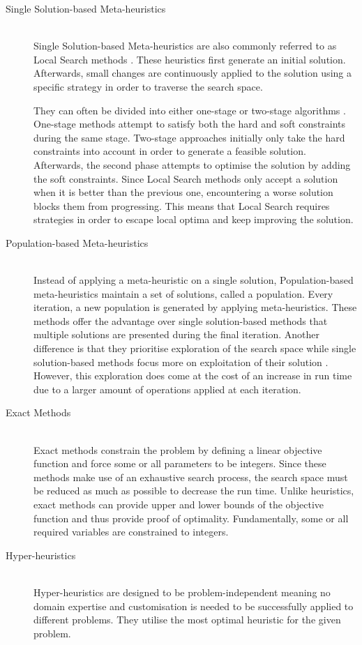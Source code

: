 \begin{description}
\item [Single Solution-based Meta-heuristics] \hfill \\
Single Solution-based Meta-heuristics are also commonly referred to as Local Search methods \cite{lin1973}. These heuristics first generate an initial solution. Afterwards, small changes are continuously applied to the solution using a specific strategy in order to traverse the search space. 

They can often be divided into either one-stage or two-stage algorithms \cite{lewis2008}. One-stage methods attempt to satisfy both the hard and soft constraints during the same stage. Two-stage approaches initially only take the hard constraints into account in order to generate a feasible solution. Afterwards, the second phase attempts to optimise the solution by adding the soft constraints. Since Local Search methods only accept a solution when it is better than the previous one, encountering a worse solution blocks them from progressing. This means that Local Search requires strategies in order to escape local optima and keep improving the solution. 



\item [Population-based Meta-heuristics] \hfill \\
Instead of applying a meta-heuristic on a single solution, Population-based meta-heuristics maintain a set of solutions, called a population. Every iteration, a new population is generated by applying meta-heuristics. These methods offer the advantage over single solution-based methods that multiple solutions are presented during the final iteration. Another difference is that they prioritise exploration of the search space while single solution-based methods focus more on exploitation of their solution  \cite{kohshori2012}. However, this exploration does come at the cost of an increase in run time due to a larger amount of operations applied at each iteration.

\item [Exact Methods]  \hfill \\
Exact methods constrain the problem by defining a linear objective function and force some or all parameters to be integers. Since these methods make use of an exhaustive search process, the search space must be reduced as much as possible to decrease the run time. Unlike heuristics, exact methods can provide upper and lower bounds of the objective function and thus provide proof of optimality. Fundamentally, some or all required variables are constrained to integers. 

\item [Hyper-heuristics] \hfill \\
Hyper-heuristics\cite{cowling2001, burke2013} are designed to be problem-independent meaning no domain expertise and customisation is needed to be successfully applied to different problems. They utilise the most optimal heuristic for the given problem.

\end{description}

